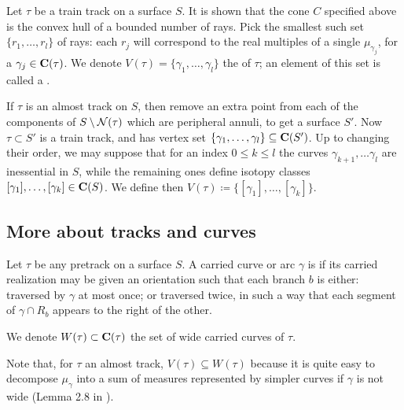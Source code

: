 \begin{defin}
Let $\tau$ be a train track on a surface $S$. It is shown that the cone $C$ specified above is the convex hull of a bounded number of rays. Pick the smallest such set $\{r_1,\ldots,r_l\}$ of rays: each $r_j$ will correspond to the real multiples of a single $\mu_{\gamma_j}$, for a $\gamma_j\in\mathbf C(\tau)$. We denote $V(\tau)=\{\gamma_1,\ldots,\gamma_l\}$ the  of $\tau$; an element of this set is called a .

If $\tau$ is an almost track on $S$, then remove an extra point from each of the components of $S\setminus{\mathcal N}(\tau)$ which are peripheral annuli, to get a surface $S'$. Now $\tau\subset S'$ is a train track, and has vertex set $\{\gamma_1,\ldots,\gamma_l\}\subseteq \mathbf C(S')$. Up to changing their order, we may suppose that for an index $0\leq k\leq l$ the curves $\gamma_{k+1},\ldots \gamma_l$ are inessential in $S$, while the remaining ones define isotopy classes $[\gamma_1],\ldots,[\gamma_k]\in\mathbf C(S)$. We define then $V(\tau)\coloneqq\{[\gamma_1],\ldots,[\gamma_k]\}$.
\end{defin}

\subsection{More about tracks and curves}

\begin{defin}
Let $\tau$ be any pretrack on a surface $S$. A carried curve or arc $\gamma$ is  if its carried realization may be given an orientation such that each branch $b$ is either: traversed by $\gamma$ at most once; or traversed twice, in such a way that each segment of $\gamma\cap R_b$ appears to the right of the other.

We denote $W(\tau)\subset \mathbf C(\tau)$ the set of wide carried curves of $\tau$.
\end{defin}

Note that, for $\tau$ an almost track, $V(\tau)\subseteq W(\tau)$ because it is quite easy to decompose $\mu_\gamma$ into a sum of measures represented by simpler curves if $\gamma$ is not wide (Lemma 2.8 in \cite{mms}).


